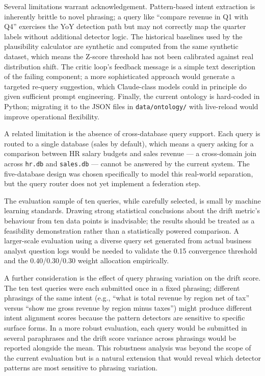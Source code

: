 \documentclass[12pt,a4paper]{report}
\begin{document}
Several limitations warrant acknowledgement. Pattern-based intent extraction is inherently brittle to novel phrasing; a query like ``compare revenue in Q1 with Q4'' exercises the YoY detection path but may not correctly map the quarter labels without additional detector logic. The historical baselines used by the plausibility calculator are synthetic and computed from the same synthetic dataset, which means the Z-score threshold has not been calibrated against real distribution shift. The critic loop's feedback message is a simple text description of the failing component; a more sophisticated approach would generate a targeted re-query suggestion, which Claude-class models could in principle do given sufficient prompt engineering. Finally, the current ontology is hard-coded in Python; migrating it to the JSON files in \texttt{data/ontology/} with live-reload would improve operational flexibility.

A related limitation is the absence of cross-database query support. Each query is routed to a single database (sales by default), which means a query asking for a comparison between HR salary budgets and sales revenue — a cross-domain join across \texttt{hr.db} and \texttt{sales.db} — cannot be answered by the current system. The five-database design was chosen specifically to model this real-world separation, but the query router does not yet implement a federation step.

The evaluation sample of ten queries, while carefully selected, is small by machine learning standards. Drawing strong statistical conclusions about the drift metric's behaviour from ten data points is inadvisable; the results should be treated as a feasibility demonstration rather than a statistically powered comparison. A larger-scale evaluation using a diverse query set generated from actual business analyst question logs would be needed to validate the 0.15 convergence threshold and the 0.40/0.30/0.30 weight allocation empirically.

A further consideration is the effect of query phrasing variation on the drift score. The ten test queries were each submitted once in a fixed phrasing; different phrasings of the same intent (e.g., ``what is total revenue by region net of tax'' versus ``show me gross revenue by region minus taxes'') might produce different intent alignment scores because the pattern detectors are sensitive to specific surface forms. In a more robust evaluation, each query would be submitted in several paraphrases and the drift score variance across phrasings would be reported alongside the mean. This robustness analysis was beyond the scope of the current evaluation but is a natural extension that would reveal which detector patterns are most sensitive to phrasing variation.
\end{document}
